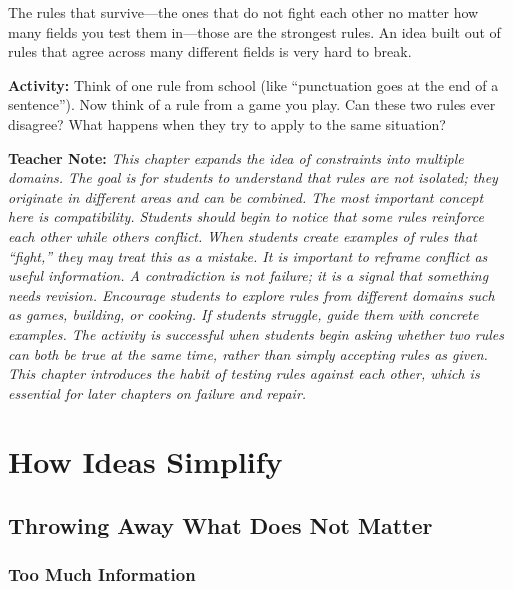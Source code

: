 \documentclass[12pt]{book}
\newenvironment{teachernote}
{\par\medskip\noindent\textbf{Teacher Note:} \itshape}
{\par\medskip}
\begin{document}
The rules that survive---the ones that do not fight each other no matter
how many fields you test them in---those are the strongest rules. An idea
built out of rules that agree across many different fields is very hard to
break.

\textbf{Activity:} Think of one rule from school (like ``punctuation goes
at the end of a sentence''). Now think of a rule from a game you play.
Can these two rules ever disagree? What happens when they try to apply to
the same situation?

\begin{teachernote}
This chapter expands the idea of constraints into multiple domains. The
goal is for students to understand that rules are not isolated; they
originate in different areas and can be combined. The most important
concept here is compatibility. Students should begin to notice that some
rules reinforce each other while others conflict. When students create
examples of rules that ``fight,'' they may treat this as a mistake. It
is important to reframe conflict as useful information. A contradiction
is not failure; it is a signal that something needs revision. Encourage
students to explore rules from different domains such as games, building,
or cooking. If students struggle, guide them with concrete examples.
The activity is successful when students begin asking whether two rules
can both be true at the same time, rather than simply accepting rules
as given. This chapter introduces the habit of testing rules against
each other, which is essential for later chapters on failure and repair.
\end{teachernote}

\part{How Ideas Simplify}

\chapter{Throwing Away What Does Not Matter}

\section{Too Much Information}
\end{document}

